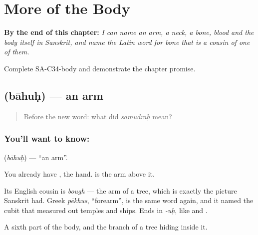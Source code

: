 
\chapter{More of the Body}
\label{ch:sa-limbs}

\begin{chapteropening}
\textbf{By the end of this chapter:} \emph{I can name an arm, a neck, a bone, blood and the body itself in Sanskrit, and name the Latin word for bone that is a cousin of one of them.}

Complete SA-C34-body and demonstrate the chapter promise.
\end{chapteropening}

\section[\texorpdfstring{\sk{बाहुः} (bāhuḥ)}{बाहुः (bāhuḥ)}]{ (bāhuḥ) — an arm}

\label{lesson:SA-C34-arm}



\begin{quote}
Before the new word: what did \emph{samudraḥ} mean?
\end{quote}

\subsection*{You'll want to know: }
\textbf{} (\emph{bāhuḥ}) — \textquotedblleft{}an arm\textquotedblright{}.

You already have \textbf{}, the hand. \textbf{} is the arm above it.

Its English cousin is \emph{bough} — the arm of a tree, which is exactly the picture Sanskrit had. Greek \emph{pēkhus}, \textquotedblleft{}forearm\textquotedblright{}, is the same word again, and it named the cubit that measured out temples and ships. Ends in \emph{-uḥ}, like \textbf{} and \textbf{}.

\begin{grammarlens}[title={What you've built}]
A sixth part of the body, and the branch of a tree hiding inside it.
\end{grammarlens}

